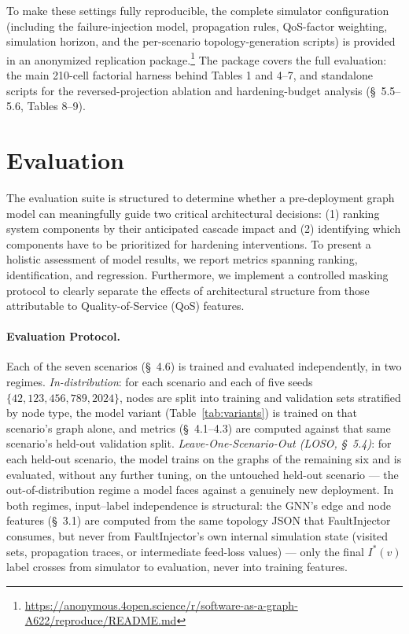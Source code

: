 \documentclass[review]{elsarticle}
\begin{document}
To make these settings fully reproducible, the complete simulator configuration (including the
failure-injection model, propagation rules, QoS-factor weighting, simulation horizon, and the
per-scenario topology-generation scripts) is provided in an anonymized replication
package.\footnote{\url{https://anonymous.4open.science/r/software-as-a-graph-A622/reproduce/README.md}}
The package covers the full evaluation: the main 210-cell factorial harness behind Tables 1 and
4--7, and standalone scripts for the reversed-projection ablation and hardening-budget analysis
(\S~5.5--5.6, Tables 8--9).

\section{Evaluation}

The evaluation suite is structured to determine whether a pre-deployment graph model can
meaningfully guide two critical architectural decisions: (1) ranking system components by their
anticipated cascade impact and (2) identifying which components have to be prioritized for
hardening interventions. To present a holistic assessment of model results, we report metrics
spanning ranking, identification, and regression. Furthermore, we implement a controlled masking
protocol to clearly separate the effects of architectural structure from those attributable to
Quality-of-Service (QoS) features.

\paragraph{Evaluation Protocol.} Each of the seven scenarios (\S~4.6) is trained and evaluated
independently, in two regimes. \emph{In-distribution}: for each scenario and each of five seeds
$\{42, 123, 456, 789, 2024\}$, nodes are split into training and validation sets stratified by node
type, the model variant (Table~\ref{tab:variants}) is trained on that scenario's graph alone, and
metrics (\S~4.1--4.3) are computed against that same scenario's held-out validation split.
\emph{Leave-One-Scenario-Out (LOSO, \S~5.4)}: for each held-out scenario, the model trains on the
graphs of the remaining six and is evaluated, without any further tuning, on the untouched held-out
scenario --- the out-of-distribution regime a model faces against a genuinely new deployment. In
both regimes, input--label independence is structural: the GNN's edge and node features (\S~3.1)
are computed from the same topology JSON that FaultInjector consumes, but never from FaultInjector's
own internal simulation state (visited sets, propagation traces, or intermediate feed-loss values)
--- only the final $I^*(v)$ label crosses from simulator to evaluation, never into training
features.
\end{document}
